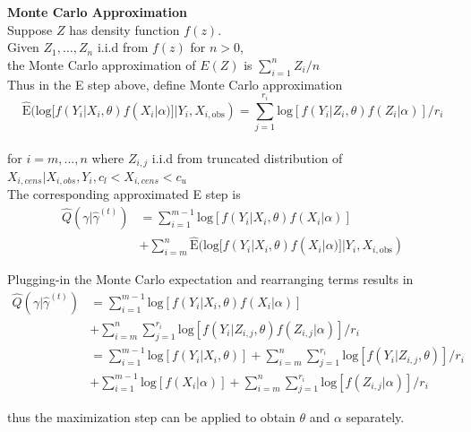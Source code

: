 \documentclass[xcolor=dvipsnames]{beamer}
\begin{document}
\begin{frame}
\textbf{Monte Carlo Approximation}\\
Suppose $Z$ has density function $f(z)$.\\
Given $Z_1, \ldots, Z_n$ i.i.d from $f(z)$ for $n>0$,\\
the Monte Carlo approximation of $E(Z)$ is $\sum_{i=1}^n Z_i/n$\\
\vspace{0.5cm}
Thus in the E step above, define Monte Carlo approximation
$$\hat{\textrm{E}}(\textrm{log}[f(Y_i | X_i, \theta) f(X_i | \alpha)]|Y_i,X_{i, \textrm{obs}})=\sum_{j=1}^{r_i} \textrm{log}[f(Y_i | Z_i, \theta) f(Z_i | \alpha)]/r_i$$\\ for $i=m, \ldots, n$ where $Z_{i,j}$ i.i.d from truncated distribution of $X_{i,cens}|X_{i,obs},Y_i,c_l<X_{i,cens}<c_u$\\
\vspace{0.5cm}
The corresponding approximated E step is
\begin{align*}
\hat{Q}(\gamma | \hat{\gamma}^{(t)})&=\sum_{i=1}^{m-1}\textrm{log}[f(Y_i | X_i, \theta) f(X_i | \alpha)]\\
 &+ \sum_{i=m}^n\hat{\textrm{E}}(\textrm{log}[f(Y_i | X_i, \theta) f(X_i | \alpha)]|Y_i,X_{i, \textrm{obs}})
 \end{align*}
\end{frame}

\begin{frame}
Plugging-in the Monte Carlo expectation and rearranging terms results in
\begin{align*}
\hat{Q}(\gamma | \hat{\gamma}^{(t)})&=\sum_{i=1}^{m-1}\textrm{log}[f(Y_i | X_i, \theta) f(X_i | \alpha)]\\ 
&+\sum_{i=m}^n\sum_{j=1}^{r_i}\textrm{log}[f(Y_i | Z_{i,j}, \theta) f(Z_{i,j} | \alpha)]/r_i\\
&= \sum_{i=1}^{m-1}\textrm{log}[f(Y_i | X_i, \theta)]+
\sum_{i=m}^n\sum_{j=1}^{r_i}\textrm{log}[f(Y_i | Z_{i,j}, \theta)]/r_i\\
&+ \sum_{i=1}^{m-1}\textrm{log}[f(X_i | \alpha)]+
\sum_{i=m}^n\sum_{j=1}^{r_i}\textrm{log}[f(Z_{i,j} | \alpha)]/r_i
\end{align*}

thus the maximization step can be applied to obtain $\theta$ and $\alpha$ separately.
\end{frame}
\end{document}
